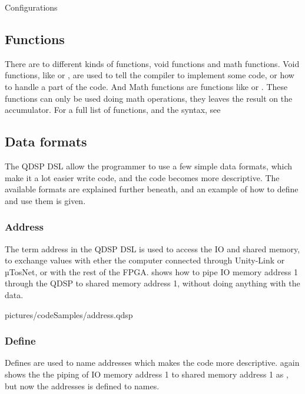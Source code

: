 	
\begin{savenotes}
	\begin{table}[H]
		\centering
			
		\caption{Configurations}
		\label{configurations}
	\end{table}
\end{savenotes}

\subsection{Functions}\label{programmingLanguage_Functions1}
There are to different kinds of functions, void functions and math functions. Void functions, like  or , are used to tell the compiler to implement some code, or how to handle a part of the code. And Math functions are functions like  or . These functions can only be used doing math operations, they leaves the result on the accumulator. For a full list of functions, and the syntax, see 

\subsection{Data formats}\label{programmingLanguage_DataFormats}
The QDSP DSL allow the programmer to use a few simple data formats, which make it a lot easier write code, and the code becomes more descriptive. The available formats are explained further beneath, and an example of how to define and use them is given.

\subsubsection{Address}
The term address in the QDSP DSL is used to access the IO and shared memory, to exchange values with ether the computer connected through Unity-Link or µTosNet, or with the rest of the FPGA.  shows how to pipe IO memory address 1 through the QDSP to shared memory address 1, without doing anything with the data.


  {pictures/codeSamples/address.qdsp}
	
\subsubsection{Define}
Defines are used to name addresses which makes the code more descriptive.  again shows the the piping of IO memory address 1 to shared memory address 1 as , but now the addresses is defined to names.

